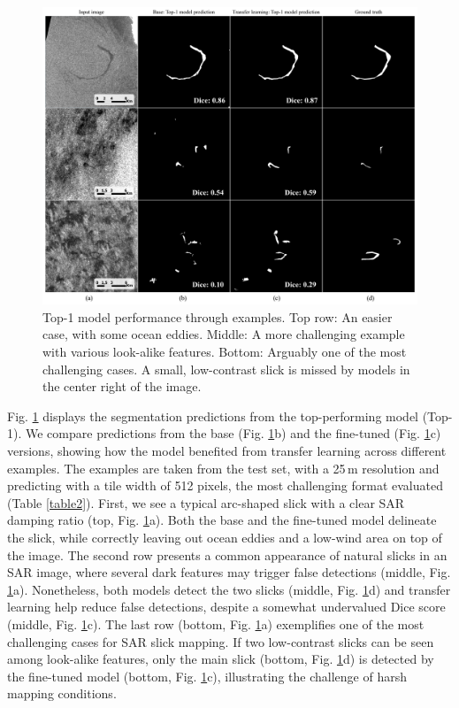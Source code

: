 \documentclass[lettersize,journal]{IEEEtran}
\begin{document}
\begin{figure}[!t]
    \centering
    \includegraphics[width=6.02in]{figures/preds4x3_v2_scale_lettering.png}
    \caption{Top-1 model performance through examples. \quad Top row: An easier case, with some ocean eddies. \quad Middle: A more challenging example with 
    various look-alike features. \quad Bottom: Arguably one of the most challenging cases. A small, low-contrast slick is missed by models in the center right of the image.}
    \label{figure3}
\end{figure}
Fig. \ref{figure3} displays the segmentation predictions from the top-performing model (Top-1). We compare predictions from the base (Fig. \ref{figure3}b) and the fine-tuned (Fig. \ref{figure3}c)
versions, showing how the model benefited from transfer learning across different examples. The examples are taken from the test set, with a 25\,m resolution and predicting 
with a tile width of 512 pixels, the most challenging format evaluated (Table \ref{table2}). First, we see a typical arc-shaped slick with a clear SAR damping ratio (top, Fig. \ref{figure3}a). 
Both the base and the fine-tuned model delineate the slick, while correctly leaving out ocean eddies and a low-wind area on top of the image. The second row presents a common appearance of natural slicks in an SAR image, 
where several dark features may trigger false detections (middle, Fig. \ref{figure3}a). Nonetheless, both models detect the two slicks (middle, Fig. \ref{figure3}d) and transfer learning 
help reduce false detections, despite a somewhat undervalued Dice score (middle, Fig. \ref{figure3}c). The last row (bottom, Fig. \ref{figure3}a) exemplifies one of the most challenging cases for SAR slick mapping. 
If two low-contrast slicks can be seen among look-alike features, only the main slick (bottom, Fig. \ref{figure3}d) is detected by the fine-tuned model (bottom, Fig. \ref{figure3}c), illustrating the challenge of 
harsh mapping conditions. 
\end{document}
